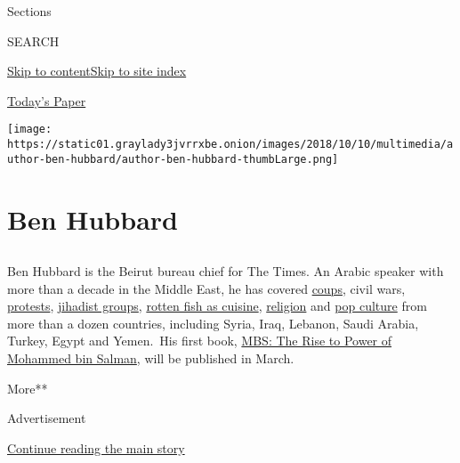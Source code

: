 Sections

SEARCH

\protect\hyperlink{site-content}{Skip to
content}\protect\hyperlink{site-index}{Skip to site index}

\href{https://myaccount.nytimes3xbfgragh.onion/auth/login?response_type=cookie\&client_id=vi}{}

\href{https://www.nytimes3xbfgragh.onion/section/todayspaper}{Today's
Paper}

\texttt{[image: https://static01.graylady3jvrrxbe.onion/images/2018/10/10/multimedia/author-ben-hubbard/author-ben-hubbard-thumbLarge.png]}

\hypertarget{ben-hubbard}{%
\section{Ben Hubbard}\label{ben-hubbard}}

\subsection{}

Ben Hubbard is the Beirut bureau chief for The Times. An Arabic speaker
with more than a decade in the Middle East, he has covered
\href{https://www.nytimes3xbfgragh.onion/2016/07/23/world/middleeast/failed-turkish-coup-accelerated-a-purge-years-in-the-making.html}{coups},
civil wars,
\href{http://www.nytimes3xbfgragh.onion/2013/08/10/world/middleeast/in-cairo-camps-protesters-dig-in-and-live-on.html}{protests},
\href{https://www.nytimes3xbfgragh.onion/2014/07/24/world/middleeast/islamic-state-controls-raqqa-syria.html}{jihadist
groups},
\href{http://www.nytimes3xbfgragh.onion/2013/05/07/world/middleeast/a-taste-of-spring-that-reeks-of-tradition.html}{rotten
fish as cuisine},
\href{https://www.nytimes3xbfgragh.onion/2016/07/11/world/middleeast/saudi-arabia-islam-wahhabism-religious-police.html}{religion}
and
\href{https://www.nytimes3xbfgragh.onion/2017/05/16/world/middleeast/isis-ramadan-tv-drama.html}{pop
culture} from more than a dozen countries, including Syria, Iraq,
Lebanon, Saudi Arabia, Turkey, Egypt and Yemen.~His first book,
\href{https://www.penguinrandomhouse.com/books/601932/mbs-by-ben-hubbard/}{MBS:
The Rise to Power of Mohammed bin Salman}, will be published in March.

More**

Advertisement

\protect\hyperlink{after-mid1}{Continue reading the main story}

